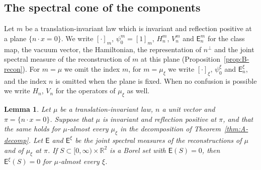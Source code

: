 \documentclass[11pt]{amsart}
\theoremstyle{plain}
\newtheorem{lemma}[theorem]{Lemma}
\theoremstyle{definition}
\theoremstyle{remark}
\numberwithin{equation}{section}
\newcommand{\R}{\mathbb{R}}
\begin{document}
\subsection{The spectral cone of the components}
Let $m$ be a translation-invariant law which is invariant and reflection positive at a plane $\{n\cdot x=0\}$. We write $[\cdot]_m$, $\psi_0^m=[1]_m$, $H^m_n$, $V^m_n$ and $\mathsf E^m_n$ for the class map, the vacuum vector, the Hamiltonian, the representation of $n^\perp$ and the joint spectral measure of the reconstruction of $m$ at this plane (Proposition~\ref{prop:B-recon}). For $m=\mu$ we omit the index $m$, for $m=\mu_\xi$ we write $[\cdot]_\xi$, $\psi_0^\xi$ and $\mathsf E^\xi_n$, and the index $n$ is omitted when the plane is fixed. When no confusion is possible we write $H_n$, $V_n$ for the operators of $\mu_\xi$ as well.


\begin{lemma}\label{lem:cone-comp}
Let $\mu$ be a translation-invariant law, $n$ a unit vector and $\pi=\{n\cdot x=0\}$. Suppose that $\mu$ is invariant and reflection positive at $\pi$, and that the same holds for $\mu$-almost every $\mu_\xi$ in the decomposition of Theorem~\ref{thm:A-decomp}. Let $\mathsf E$ and $\mathsf E^\xi$ be the joint spectral measures of the reconstructions of $\mu$ and of $\mu_\xi$ at $\pi$. If $S\subset[0,\infty)\times\R^2$ is a Borel set with $\mathsf E(S)=0$, then $\mathsf E^\xi(S)=0$ for $\mu$-almost every $\xi$.
\end{lemma}
\end{document}
